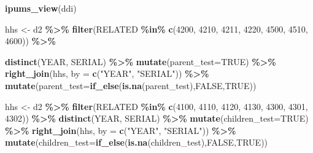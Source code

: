 \documentclass[
]{book}
\newenvironment{Shaded}{\begin{snugshade}}{\end{snugshade}}
\newcommand{\AttributeTok}[1]{\textcolor[rgb]{0.13,0.29,0.53}{#1}}
\newcommand{\ConstantTok}[1]{\textcolor[rgb]{0.56,0.35,0.01}{#1}}
\newcommand{\DecValTok}[1]{\textcolor[rgb]{0.00,0.00,0.81}{#1}}
\newcommand{\FunctionTok}[1]{\textcolor[rgb]{0.13,0.29,0.53}{\textbf{#1}}}
\newcommand{\NormalTok}[1]{#1}
\newcommand{\OtherTok}[1]{\textcolor[rgb]{0.56,0.35,0.01}{#1}}
\newcommand{\SpecialCharTok}[1]{\textcolor[rgb]{0.81,0.36,0.00}{\textbf{#1}}}
\newcommand{\StringTok}[1]{\textcolor[rgb]{0.31,0.60,0.02}{#1}}
\begin{document}
\begin{Shaded}
\begin{Highlighting}[]
\FunctionTok{ipums\_view}\NormalTok{(ddi)}
\end{Highlighting}
\end{Shaded}

\begin{Shaded}
\begin{Highlighting}[]
\NormalTok{  hhs }\OtherTok{\textless{}{-}}\NormalTok{ d2 }\SpecialCharTok{\%\textgreater{}\%} \FunctionTok{filter}\NormalTok{(RELATED }\SpecialCharTok{\%in\%} \FunctionTok{c}\NormalTok{(}\DecValTok{4200}\NormalTok{, }\DecValTok{4210}\NormalTok{, }\DecValTok{4211}\NormalTok{, }\DecValTok{4220}\NormalTok{, }\DecValTok{4500}\NormalTok{, }\DecValTok{4510}\NormalTok{, }\DecValTok{4600}\NormalTok{)) }\SpecialCharTok{\%\textgreater{}\%} 
  
  \FunctionTok{distinct}\NormalTok{(YEAR, SERIAL) }\SpecialCharTok{\%\textgreater{}\%} \FunctionTok{mutate}\NormalTok{(}\AttributeTok{parent\_test=}\ConstantTok{TRUE}\NormalTok{) }\SpecialCharTok{\%\textgreater{}\%} \FunctionTok{right\_join}\NormalTok{(hhs, }\AttributeTok{by =} \FunctionTok{c}\NormalTok{(}\StringTok{"YEAR"}\NormalTok{, }\StringTok{"SERIAL"}\NormalTok{)) }\SpecialCharTok{\%\textgreater{}\%} \FunctionTok{mutate}\NormalTok{(}\AttributeTok{parent\_test=}\FunctionTok{if\_else}\NormalTok{(}\FunctionTok{is.na}\NormalTok{(parent\_test),}\ConstantTok{FALSE}\NormalTok{,}\ConstantTok{TRUE}\NormalTok{))}

\NormalTok{  hhs }\OtherTok{\textless{}{-}}\NormalTok{ d2 }\SpecialCharTok{\%\textgreater{}\%} \FunctionTok{filter}\NormalTok{(RELATED }\SpecialCharTok{\%in\%} \FunctionTok{c}\NormalTok{(}\DecValTok{4100}\NormalTok{, }\DecValTok{4110}\NormalTok{, }\DecValTok{4120}\NormalTok{, }\DecValTok{4130}\NormalTok{, }\DecValTok{4300}\NormalTok{, }\DecValTok{4301}\NormalTok{, }\DecValTok{4302}\NormalTok{)) }\SpecialCharTok{\%\textgreater{}\%} \FunctionTok{distinct}\NormalTok{(YEAR, SERIAL) }\SpecialCharTok{\%\textgreater{}\%} \FunctionTok{mutate}\NormalTok{(}\AttributeTok{children\_test=}\ConstantTok{TRUE}\NormalTok{) }\SpecialCharTok{\%\textgreater{}\%} \FunctionTok{right\_join}\NormalTok{(hhs, }\AttributeTok{by =} \FunctionTok{c}\NormalTok{(}\StringTok{"YEAR"}\NormalTok{, }\StringTok{"SERIAL"}\NormalTok{)) }\SpecialCharTok{\%\textgreater{}\%} \FunctionTok{mutate}\NormalTok{(}\AttributeTok{children\_test=}\FunctionTok{if\_else}\NormalTok{(}\FunctionTok{is.na}\NormalTok{(children\_test),}\ConstantTok{FALSE}\NormalTok{,}\ConstantTok{TRUE}\NormalTok{))}
\end{Highlighting}
\end{Shaded}
\end{document}
